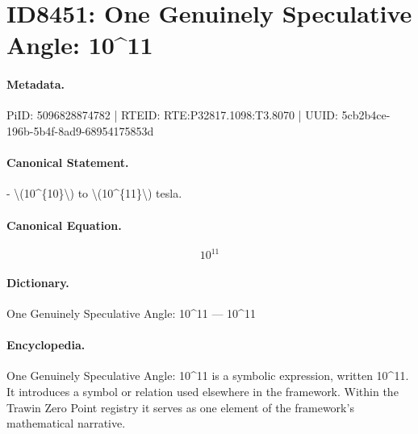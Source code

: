 \section*{ID8451: One Genuinely Speculative Angle: 10\textasciicircum{}11}
\paragraph{Metadata.}
PiID: 5096828874782 | RTEID: RTE:P32817.1098:T3.8070 | UUID: 5cb2b4ce-196b-5b4f-8ad9-68954175853d

\paragraph{Canonical Statement.}
- \textbackslash{}(10\textasciicircum{}\{10\}\textbackslash{}) to \textbackslash{}(10\textasciicircum{}\{11\}\textbackslash{}) tesla.

\paragraph{Canonical Equation.}
\[
10^{11}
\]

\paragraph{Dictionary.}
One Genuinely Speculative Angle: 10\textasciicircum{}11 — 10\textasciicircum{}11

\paragraph{Encyclopedia.}
One Genuinely Speculative Angle: 10\textasciicircum{}11 is a symbolic expression, written 10\textasciicircum{}11. It introduces a symbol or relation used elsewhere in the framework. Within the Trawin Zero Point registry it serves as one element of the framework's mathematical narrative.

